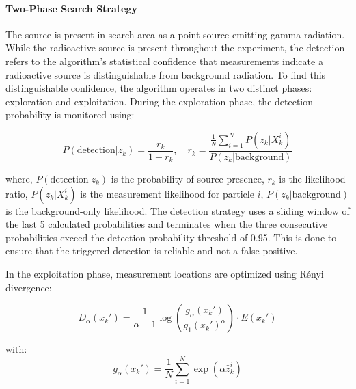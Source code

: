 \documentclass[../report.tex]{subfiles}
\begin{document}
    \paragraph{Two-Phase Search Strategy}
    The source is present in search area as a point source emitting gamma radiation. While the radioactive source is present throughout the experiment, the 
    detection refers to the algorithm's statistical confidence that measurements indicate a radioactive source is distinguishable from background radiation. To
    find this distinguishable confidence, the algorithm operates in two distinct phases: exploration and exploitation. 
    During the exploration phase, the detection probability is monitored using:

    \begin{equation}
    P(\text{detection}|z_k) = \frac{r_k}{1 + r_k}, \quad r_k = \frac{\frac{1}{N}\sum_{i=1}^N P(z_k|X_k^i)}{P(z_k|\text{background})}
    \label{eq:prob_detection}
    \end{equation}

    where, $P(\text{detection}|z_k)$ is the probability of source presence, $r_k$ is the likelihood ratio, $P(z_k|X_k^i)$ is the measurement likelihood for particle $i$, $P(z_k|\text{background})$ 
    is the background-only likelihood. The detection strategy uses a sliding window of the last 5 calculated probabilities and terminates when the three consecutive probabilities exceed the detection
    probability threshold of 0.95. This is done to ensure that the triggered detection is reliable and not a false positive.

    In the exploitation phase, measurement locations are optimized using Rényi divergence:

    \begin{equation}
    D_\alpha(x_k') = \frac{1}{\alpha-1} \log\left(\frac{g_\alpha(x_k')}{g_1(x_k')^\alpha}\right) \cdot E(x_k')
    \end{equation}

    with:
    \begin{equation}
    g_\alpha(x_k') = \frac{1}{N}\sum_{i=1}^N \exp(\alpha \hat{z}_k^i)
    \end{equation}
\end{document}
